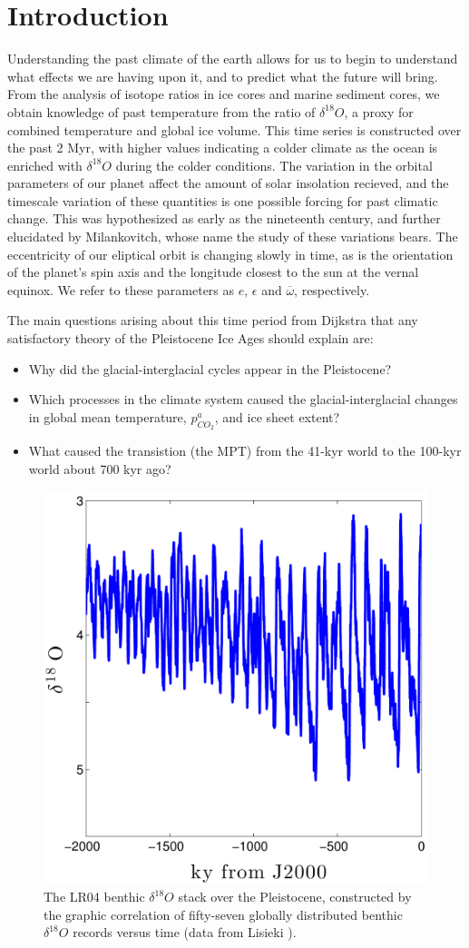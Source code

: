 \section{Introduction}

Understanding the past climate of the earth allows for us to begin to understand what effects we are having upon it, and to predict what the future will bring.
From the analysis of isotope ratios in ice cores and marine sediment cores, we obtain knowledge of past temperature from the ratio of $\delta ^{18} O$, a proxy for combined temperature and global ice volume.
This time series is constructed over the past 2 Myr, with higher values indicating a colder climate as the ocean is enriched with $\delta ^{18} O$ during the colder conditions.
The variation in the orbital parameters of our planet affect the amount of solar insolation recieved, and the timescale variation of these quantities is one possible forcing for past climatic change.
This was hypothesized as early as the nineteenth century, and further elucidated by Milankovitch, whose name the study of these variations bears.
The eccentricity of our eliptical orbit is changing slowly in time, as is the orientation of the planet's spin axis and the longitude closest to the sun at the vernal equinox.
We refer to these parameters as $e$, $\epsilon$ and $\overline{\omega}$, respectively.

The main questions arising about this time period from Dijkstra \cite{dijkstra2013} that any satisfactory theory of the Pleistocene Ice Ages should explain are:
\begin{itemize}
\item Why did the glacial-interglacial cycles appear in the Pleistocene?
\item Which processes in the climate system caused the glacial-interglacial changes in global mean temperature, $p^a_{CO_2}$, and ice sheet extent?
\item What caused the transistion (the MPT) from the 41-kyr world to the 100-kyr world about 700 kyr ago?
\end{itemize}

\begin{figure}[tpb!]
\centering
  \includegraphics[width=.48\textwidth]{../data/dO18/d18O_lisiecki_noname.pdf}
  \caption{
    The LR04 benthic $\delta ^{18} O$ stack over the Pleistocene, constructed by the graphic correlation of fifty-seven globally distributed benthic $\delta ^{18} O$ records versus time (data from Lisieki \cite{lisiecki2005pliocene}).
  }
  \label{fig:insol-data}
\end{figure}

